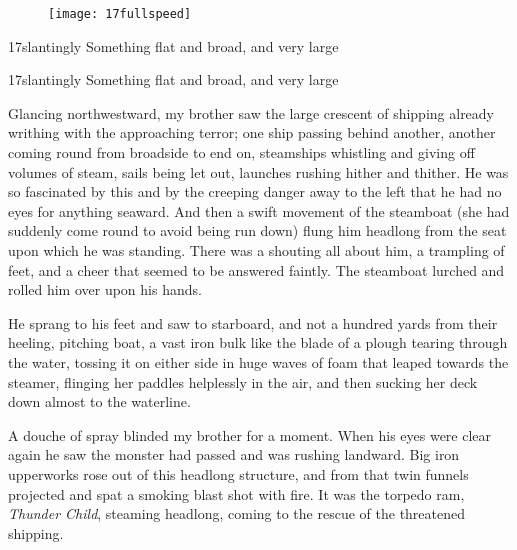 \begin{a4}
\begin{figure}[tb!]
\centering
\texttt{[image: 17fullspeed]}
\end{figure}
\end{a4}


\begin{pictures}
\begin{letter}
	\begin{bwbigpic}
		[1.2] 
		{17slantingly} 
		{Something flat and broad, and very large} 
	\end{bwbigpic}
\end{letter}
\begin{a4}
	\begin{bwbigpic}
		[1.1] 
		{17slantingly} 
		{Something flat and broad, and very large} 
	\end{bwbigpic}
\end{a4}
\end{pictures}

Glancing northwestward, my brother saw the large crescent of shipping already writhing with the approaching terror; one ship passing behind another, another coming round from broadside to end on, steamships whistling and giving off volumes of steam, sails being let out, launches rushing hither and thither. He was so fascinated by this and by the creeping danger away to the left that he had no eyes for anything seaward. And then a swift movement of the steamboat (she had suddenly come round to avoid being run down) flung him headlong from the seat upon which he was standing. There was a shouting all about him, a trampling of feet, and a cheer that seemed to be answered faintly. The steamboat lurched and rolled him over upon his hands.

He sprang to his feet and saw to starboard, and not a hundred yards from their heeling, pitching boat, a vast iron bulk like the blade of a plough tearing through the water, tossing it on either side in huge waves of foam that leaped towards the steamer, flinging her paddles helplessly in the air, and then sucking her deck down almost to the waterline.

A douche of spray blinded my brother for a moment. When his eyes were clear again he saw the monster had passed and was rushing landward. Big iron upperworks rose out of this headlong structure, and from that twin funnels projected and spat a smoking blast shot with fire. It was the torpedo ram, \textit{Thunder Child}, steaming headlong, coming to the rescue of the threatened shipping.

